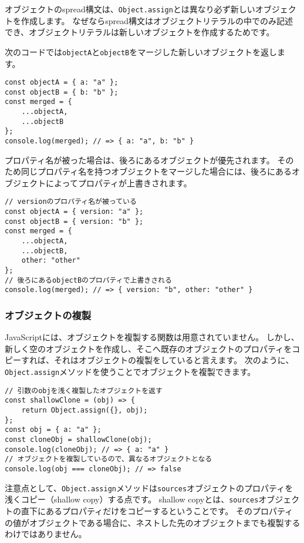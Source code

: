 オブジェクトのspread構文は、\texttt{Object.assign}とは異なり必ず新しいオブジェクトを作成します。
なぜならspread構文はオブジェクトリテラルの中でのみ記述でき、オブジェクトリテラルは新しいオブジェクトを作成するためです。

次のコードでは\texttt{objectA}と\texttt{objectB}をマージした新しいオブジェクトを返します。

\begin{lstlisting}
const objectA = { a: "a" };
const objectB = { b: "b" };
const merged = { 
    ...objectA,
    ...objectB
};
console.log(merged); // => { a: "a", b: "b" }
\end{lstlisting}

プロパティ名が被った場合は、後ろにあるオブジェクトが優先されます。
そのため同じプロパティ名を持つオブジェクトをマージした場合には、後ろにあるオブジェクトによってプロパティが上書きされます。

\begin{lstlisting}
// versionのプロパティ名が被っている
const objectA = { version: "a" };
const objectB = { version: "b" };
const merged = { 
    ...objectA,
    ...objectB,
    other: "other"
};
// 後ろにあるobjectBのプロパティで上書きされる
console.log(merged); // => { version: "b", other: "other" }
\end{lstlisting}

\hypertarget{copy}{%
\subsubsection{オブジェクトの複製}\label{copy}}

JavaScriptには、オブジェクトを複製する関数は用意されていません。
しかし、新しく空のオブジェクトを作成し、そこへ既存のオブジェクトのプロパティをコピーすれば、それはオブジェクトの複製をしていると言えます。
次のように、\texttt{Object.assign}メソッドを使うことでオブジェクトを複製できます。

\begin{lstlisting}
// 引数のobjを浅く複製したオブジェクトを返す
const shallowClone = (obj) => {
    return Object.assign({}, obj);
};
const obj = { a: "a" };
const cloneObj = shallowClone(obj);
console.log(cloneObj); // => { a: "a" }
// オブジェクトを複製しているので、異なるオブジェクトとなる
console.log(obj === cloneObj); // => false
\end{lstlisting}

注意点として、\texttt{Object.assign}メソッドは\texttt{sources}オブジェクトのプロパティを浅くコピー（shallow
copy）する点です。 shallow
copyとは、\texttt{sources}オブジェクトの直下にあるプロパティだけをコピーするということです。
そのプロパティの値がオブジェクトである場合に、ネストした先のオブジェクトまでも複製するわけではありません。

